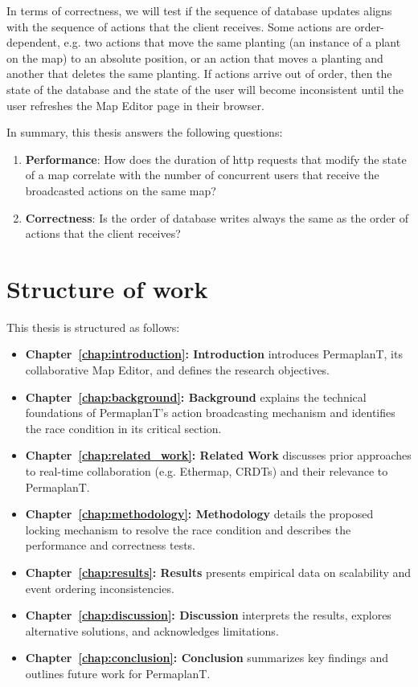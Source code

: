 \documentclass[final,oneside]{vutinfth}
\begin{document}
In terms of correctness, we will test if the sequence of database updates aligns with the sequence of actions that the client receives.
Some actions are order-dependent, e.g. two actions that move the same planting (an instance of a plant on the map) to an absolute position, or an action that moves a planting and another that deletes the same planting.
If actions arrive out of order, then the state of the database and the state of the user will become inconsistent until the user refreshes the Map Editor page in their browser.

In summary, this thesis answers the following questions:
\begin{enumerate}
  \item \textbf{Performance}: How does the duration of \gls{http} requests that modify the state of a map correlate with the number of concurrent users that receive the broadcasted actions on the same map?
  \item \textbf{Correctness}: Is the order of database writes always the same as the order of actions that the client receives?
\end{enumerate}

\section{Structure of work}

This thesis is structured as follows:

\begin{itemize}[leftmargin=1.5em]  
  \item \textbf{Chapter~\ref{chap:introduction}: Introduction} introduces PermaplanT, its collaborative Map Editor, and defines the research objectives.  
  \item \textbf{Chapter~\ref{chap:background}: Background} explains the technical foundations of PermaplanT’s action broadcasting mechanism and identifies the race condition in its critical section.  
  \item \textbf{Chapter~\ref{chap:related_work}: Related Work} discusses prior approaches to real-time collaboration (e.g. Ethermap, CRDTs) and their relevance to PermaplanT.  
  \item \textbf{Chapter~\ref{chap:methodology}: Methodology} details the proposed locking mechanism to resolve the race condition and describes the performance and correctness tests.  
  \item \textbf{Chapter~\ref{chap:results}: Results} presents empirical data on scalability and event ordering inconsistencies.  
  \item \textbf{Chapter~\ref{chap:discussion}: Discussion} interprets the results, explores alternative solutions, and acknowledges limitations.  
  \item \textbf{Chapter~\ref{chap:conclusion}: Conclusion} summarizes key findings and outlines future work for PermaplanT.  
\end{itemize}
\end{document}
